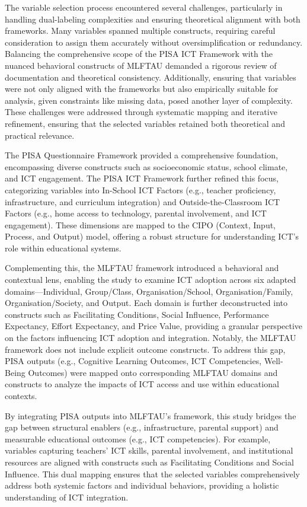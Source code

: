 \documentclass[
]{article}
\begin{document}
The variable selection process encountered several challenges,
particularly in handling dual-labeling complexities and ensuring
theoretical alignment with both frameworks. Many variables spanned
multiple constructs, requiring careful consideration to assign them
accurately without oversimplification or redundancy. Balancing the
comprehensive scope of the PISA ICT Framework with the nuanced
behavioral constructs of MLFTAU demanded a rigorous review of
documentation and theoretical consistency. Additionally, ensuring that
variables were not only aligned with the frameworks but also empirically
suitable for analysis, given constraints like missing data, posed
another layer of complexity. These challenges were addressed through
systematic mapping and iterative refinement, ensuring that the selected
variables retained both theoretical and practical relevance.

The PISA Questionnaire Framework provided a comprehensive foundation,
encompassing diverse constructs such as socioeconomic status, school
climate, and ICT engagement. The PISA ICT Framework further refined this
focus, categorizing variables into In-School ICT Factors (e.g., teacher
proficiency, infrastructure, and curriculum integration) and
Outside-the-Classroom ICT Factors (e.g., home access to technology,
parental involvement, and ICT engagement). These dimensions are mapped
to the CIPO (Context, Input, Process, and Output) model, offering a
robust structure for understanding ICT's role within educational
systems.

Complementing this, the MLFTAU framework introduced a behavioral and
contextual lens, enabling the study to examine ICT adoption across six
adapted domains---Individual, Group/Class, Organisation/School,
Organisation/Family, Organisation/Society, and Output. Each domain is
further deconstructed into constructs such as Facilitating Conditions,
Social Influence, Performance Expectancy, Effort Expectancy, and Price
Value, providing a granular perspective on the factors influencing ICT
adoption and integration. Notably, the MLFTAU framework does not include
explicit outcome constructs. To address this gap, PISA outputs (e.g.,
Cognitive Learning Outcomes, ICT Competencies, Well-Being Outcomes) were
mapped onto corresponding MLFTAU domains and constructs to analyze the
impacts of ICT access and use within educational contexts.

By integrating PISA outputs into MLFTAU's framework, this study bridges
the gap between structural enablers (e.g., infrastructure, parental
support) and measurable educational outcomes (e.g., ICT competencies).
For example, variables capturing teachers' ICT skills, parental
involvement, and institutional resources are aligned with constructs
such as Facilitating Conditions and Social Influence. This dual mapping
ensures that the selected variables comprehensively address both
systemic factors and individual behaviors, providing a holistic
understanding of ICT integration.
\end{document}
